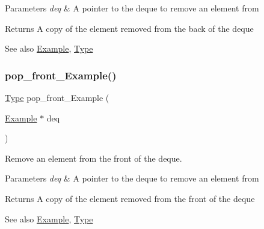\begin{DoxyParams}{Parameters}
{\em deq} & A pointer to the deque to remove an element from\\
\hline
\end{DoxyParams}
\begin{DoxyReturn}{Returns}
A copy of the element removed from the back of the deque
\end{DoxyReturn}
\begin{DoxySeeAlso}{See also}
\hyperlink{structExample}{Example}, \hyperlink{group__DEQUE_gac9c83c2070eb6b5891cf742b90f54c68}{Type} 
\end{DoxySeeAlso}
\mbox{\label{group__DEQUE_ga9fe851644b8743ed3e189e2b7872641a}} 
\subsubsection{\texorpdfstring{pop\+\_\+front\+\_\+\+Example()}{pop\_front\_Example()}}
{\footnotesize\ttfamily \hyperlink{group__DEQUE_gac9c83c2070eb6b5891cf742b90f54c68}{Type} pop\+\_\+front\+\_\+\+Example (\begin{DoxyParamCaption}\item[{\hyperlink{structExample}{Example} $\ast$}]{deq }\end{DoxyParamCaption})}



Remove an element from the front of the deque. 


\begin{DoxyParams}{Parameters}
{\em deq} & A pointer to the deque to remove an element from\\
\hline
\end{DoxyParams}
\begin{DoxyReturn}{Returns}
A copy of the element removed from the front of the deque
\end{DoxyReturn}
\begin{DoxySeeAlso}{See also}
\hyperlink{structExample}{Example}, \hyperlink{group__DEQUE_gac9c83c2070eb6b5891cf742b90f54c68}{Type} 
\end{DoxySeeAlso}
\mbox{\label{group__DEQUE_ga63a0566b60e881121b5ba029a25cb9ae}} 
